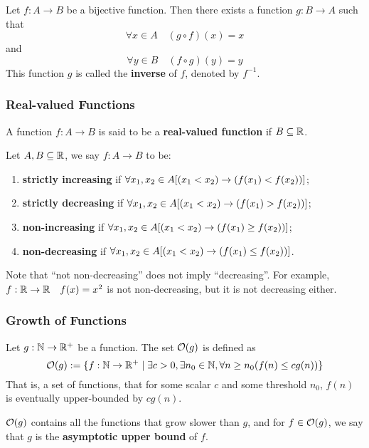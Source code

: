 \begin{definition}
    Let $f:A\to B$ be a bijective function. Then there exists a function $g:B\to A$ such that
    \[
        \forall x \in A \quad (g\circ f)(x) = x
    \]
    and
    \[
        \forall y \in B \quad (f\circ g)(y) = y
    \]
    This function $g$ is called the \textbf{inverse} of $f$, denoted by $f^{-1}$.
\end{definition}

\subsubsection{Real-valued Functions}

\begin{definition}
    A function $f:A\to B$ is said to be a \textbf{real-valued function} if $B \subseteq \mathbb{R}$.
\end{definition}

\begin{theorem}
    Let $A,B\subseteq\mathbb{R}$, we say $f:A\to B$ to be:
    \begin{enumerate}
        \item \textbf{strictly increasing} if $\forall x_1, x_2 \in A [(x_1 < x_2) \rightarrow (f(x_1) < f(x_2))]$;
        \item \textbf{strictly decreasing} if $\forall x_1, x_2 \in A [(x_1 < x_2) \rightarrow (f(x_1) > f(x_2))]$;
        \item \textbf{non-increasing} if $\forall x_1, x_2 \in A [(x_1 < x_2) \rightarrow (f(x_1) \geq f(x_2))]$;
        \item \textbf{non-decreasing} if $\forall x_1, x_2 \in A [(x_1 < x_2) \rightarrow (f(x_1) \leq f(x_2))]$.
    \end{enumerate}
\end{theorem}

\begin{remark}
    Note that ``not non-decreasing'' does not imply ``decreasing''.
    For example, $f:\mathbb{R}\to\mathbb{R}\quad f(x) = x^2$ is not non-decreasing, but it is not decreasing either.
\end{remark}

\subsubsection{Growth of Functions}

\begin{definition}
    Let $g:\mathbb{N}\to\mathbb{R}^+$ be a function. The set $\mathcal{O}(g)$ is defined as
    \[
        \mathcal{O}(g) := \{f:\mathbb{N}\to\mathbb{R}^+ \mid \exists c>0, \exists n_0\in\mathbb{N}, \forall n\geq n_0 (f(n) \leq c g(n))\}
    \]
    That is, a set of functions, that for some scalar $c$ and some threshold $n_0$,
    $f(n)$ is eventually upper-bounded by $c g(n)$.

    $\mathcal{O}(g)$ contains all the functions that grow slower than $g$, and for $f\in\mathcal{O}(g)$,
    we say that $g$ is the \textbf{asymptotic upper bound} of $f$.
\end{definition}

